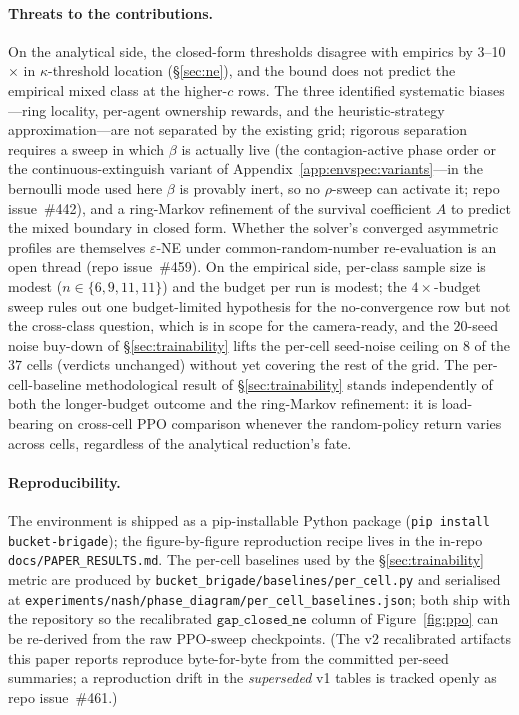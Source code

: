 \documentclass{anvil-paper}
\begin{document}
\paragraph{Threats to the contributions.}
On the analytical side, the closed-form thresholds disagree with
empirics by 3--10$\times$ in $\kappa$-threshold location
(\S\ref{sec:ne}), and the bound does not predict the empirical
\textsf{mixed} class at the higher-$c$ rows. The three identified
systematic biases---ring locality, per-agent ownership rewards, and the
heuristic-strategy approximation---are not separated by the existing
grid; rigorous separation requires a sweep in which $\beta$ is actually
live (the contagion-active phase order or the continuous-extinguish
variant of Appendix~\ref{app:envspec:variants}---in the bernoulli mode
used here $\beta$ is provably inert, so no $\rho$-sweep can activate it;
repo issue~\#442), and a
ring-Markov refinement of the survival coefficient $A$ to predict the
\textsf{mixed} boundary in closed form. Whether the solver's converged
asymmetric profiles are themselves $\varepsilon$-NE under
common-random-number re-evaluation is an open thread (repo
issue~\#459). On the empirical side, per-class
sample size is modest ($n\in\{6,9,11,11\}$) and the budget per run is
modest; the $4{\times}$-budget sweep rules out one budget-limited
hypothesis for the no-convergence row but not the cross-class question,
which is in scope for the camera-ready, and the $20$-seed noise
buy-down of \S\ref{sec:trainability} lifts the per-cell seed-noise
ceiling on $8$ of the $37$ cells (verdicts unchanged) without yet
covering the rest of the grid. The per-cell-baseline
methodological result of \S\ref{sec:trainability} stands independently
of both the longer-budget outcome and the ring-Markov refinement: it is
load-bearing on cross-cell PPO comparison whenever the random-policy
return varies across cells, regardless of the analytical reduction's
fate.

\paragraph{Reproducibility.}
The environment is shipped as a pip-installable Python package
(\texttt{pip install bucket-brigade}); the figure-by-figure reproduction
recipe lives in the in-repo \texttt{docs/PAPER\_RESULTS.md}. The per-cell
baselines used by the \S\ref{sec:trainability} metric are produced by
\texttt{bucket\_brigade/baselines/per\_cell.py} and serialised at
\texttt{experiments/nash/phase\_diagram/per\_cell\_baselines.json}; both
ship with the repository so the recalibrated $\texttt{gap\_closed\_ne}$
column of Figure~\ref{fig:ppo} can be re-derived from the raw PPO-sweep
checkpoints. (The v2 recalibrated artifacts this paper reports
reproduce byte-for-byte from the committed per-seed summaries; a
reproduction drift in the \emph{superseded} v1 tables is tracked openly
as repo issue~\#461.)
\end{document}
